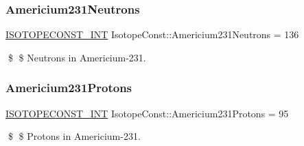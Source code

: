 \subsubsection{\texorpdfstring{Americium231\+Neutrons}{Americium231Neutrons}}
{\footnotesize\ttfamily \mbox{\hyperlink{group___isotope_const-_macros_ga5f18360b3e99483a35c32d789e62621c}{I\+S\+O\+T\+O\+P\+E\+C\+O\+N\+S\+T\+\_\+\+I\+NT}} Isotope\+Const\+::\+Americium231\+Neutrons = 136}

\$ \$ Neutrons in Americium-\/231. \mbox{\label{group___isotope_const-_americium-_am231_ga042ba4e85ed0a8a0995b31194f36216c}} 
\subsubsection{\texorpdfstring{Americium231\+Protons}{Americium231Protons}}
{\footnotesize\ttfamily \mbox{\hyperlink{group___isotope_const-_macros_ga5f18360b3e99483a35c32d789e62621c}{I\+S\+O\+T\+O\+P\+E\+C\+O\+N\+S\+T\+\_\+\+I\+NT}} Isotope\+Const\+::\+Americium231\+Protons = 95}

\$ \$ Protons in Americium-\/231. 